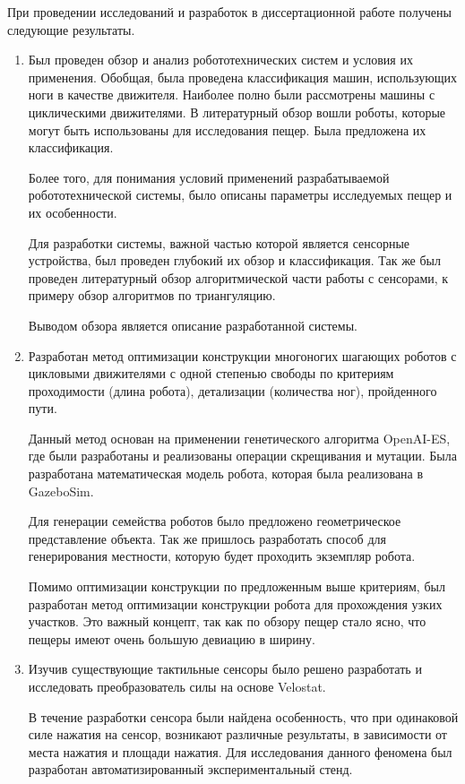 При  проведении  исследований  и  разработок  в  диссертационной  работе  получены следующие результаты.
\begin{enumerate}
  \item Был проведен обзор и анализ робототехнических систем и условия их применения. Обобщая, была проведена классификация машин, использующих ноги в качестве движителя. Наиболее полно были рассмотрены машины с циклическими движителями. В литературный обзор вошли роботы, которые могут быть использованы для исследования пещер. Была предложена их классификация.

  Более того, для понимания условий применений разрабатываемой робототехнической системы, было описаны параметры исследуемых пещер и их особенности.

  Для разработки системы, важной частью которой является сенсорные устройства, был проведен глубокий их обзор и классификация. Так же был проведен литературный обзор алгоритмической части работы с сенсорами, к примеру обзор алгоритмов по триангуляцию.

  Выводом обзора является описание разработанной системы.
  \item Разработан метод оптимизации конструкции многоногих шагающих роботов с цикловыми движителями с одной степенью свободы по критериям проходимости (длина робота), детализации (количества ног), пройденного пути.

  Данный метод основан на применении генетического алгоритма OpenAI-ES, где были разработаны и реализованы операции скрещивания и мутации. Была разработана математическая модель робота, которая была реализована в GazeboSim. 
  
  Для генерации семейства роботов было предложено геометрическое представление объекта. Так же пришлось разработать способ для генерирования местности, которую будет проходить экземпляр робота.

  Помимо оптимизации конструкции по предложенным выше критериям, был разработан метод оптимизации конструкции робота для прохождения узких участков. Это важный концепт, так как по обзору пещер стало ясно, что пещеры имеют очень большую девиацию в ширину.
  \item Изучив существующие тактильные сенсоры было решено разработать и исследовать преобразователь силы на основе Velostat.

  В течение разработки сенсора были найдена особенность, что при одинаковой силе нажатия на сенсор, возникают различные результаты, в зависимости от места нажатия и площади нажатия. Для исследования данного феномена был разработан автоматизированный экспериментальный стенд. 
  

\end{enumerate}
